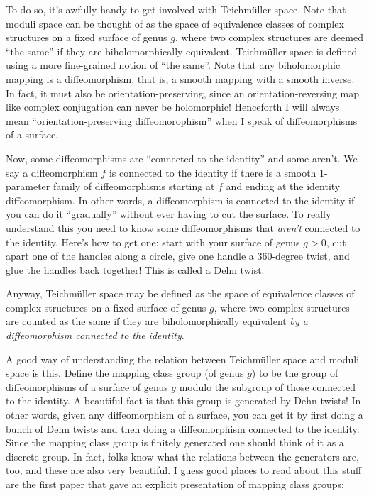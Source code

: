 \documentclass{article}
\begin{document}
To do so, it's awfully handy to get involved with Teichm\"uller space.
Note that moduli space can be thought of as the space of equivalence
classes of complex structures on a fixed surface of genus \(g\), where
two complex structures are deemed ``the same'' if they are
biholomorphically equivalent. Teichm\"uller space is defined using a more
fine-grained notion of ``the same''. Note that any biholomorphic mapping
is a diffeomorphism, that is, a smooth mapping with a smooth inverse. In
fact, it must also be orientation-preserving, since an
orientation-reversing map like complex conjugation can never be
holomorphic! Henceforth I will always mean ``orientation-preserving
diffeomorophism'' when I speak of diffeomorphisms of a surface.

Now, some diffeomorphisms are ``connected to the identity'' and some
aren't. We say a diffeomorphism \(f\) is connected to the identity if
there is a smooth 1-parameter family of diffeomorphisms starting at
\(f\) and ending at the identity diffeomorphism. In other words, a
diffeomorphism is connected to the identity if you can do it
``gradually'' without ever having to cut the surface. To really
understand this you need to know some diffeomorphisms that \emph{aren't}
connected to the identity. Here's how to get one: start with your
surface of genus \(g > 0\), cut apart one of the handles along a circle,
give one handle a 360-degree twist, and glue the handles back together!
This is called a Dehn twist.

Anyway, Teichm\"uller space may be defined as the space of equivalence
classes of complex structures on a fixed surface of genus \(g\), where
two complex structures are counted as the same if they are
biholomorphically equivalent \emph{by a diffeomorphism connected to the
identity}.

A good way of understanding the relation between Teichm\"uller space and
moduli space is this. Define the mapping class group (of genus \(g\)) to
be the group of diffeomorphisms of a surface of genus \(g\) modulo the
subgroup of those connected to the identity. A beautiful fact is that
this group is generated by Dehn twists! In other words, given any
diffeomorphism of a surface, you can get it by first doing a bunch of
Dehn twists and then doing a diffeomorphism connected to the identity.
Since the mapping class group is finitely generated one should think of
it as a discrete group. In fact, folks know what the relations between
the generators are, too, and these are also very beautiful. I guess good
places to read about this stuff are the first paper that gave an
explicit presentation of mapping class groups:
\end{document}
